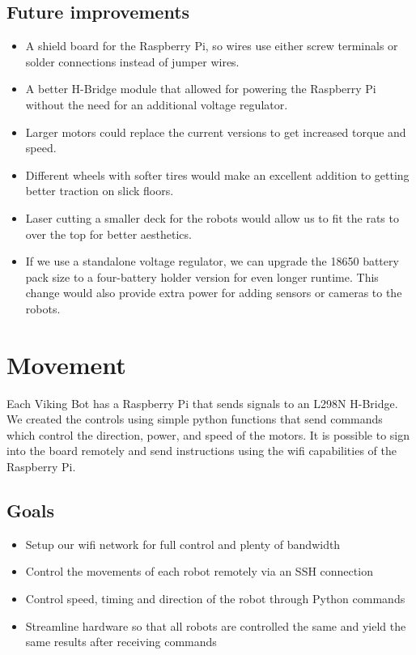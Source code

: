 \documentclass[a4paper,12pt]{article}
\begin{document}
\subsection{Future improvements}
	\begin{itemize}
		\item A shield board for the Raspberry Pi, so wires use either screw terminals or solder connections instead of jumper wires.
		\item A better H-Bridge module that allowed for powering the Raspberry Pi without the need for an additional voltage regulator.
		\item Larger motors could replace the current versions to get increased torque and speed.
		\item Different wheels with softer tires would make an excellent addition to getting better traction on slick floors.
		\item Laser cutting a smaller deck for the robots would allow us to fit the rats to over the top for better aesthetics.
		\item If we use a standalone voltage regulator, we can upgrade the 18650 battery pack size to a four-battery holder version for even longer runtime. This change would also provide extra power for adding sensors or cameras to the robots.
	\end{itemize}

\section{Movement}
	Each Viking Bot has a Raspberry Pi that sends signals to an L298N H-Bridge. We created the controls using simple python functions that send commands which control the direction, power, and speed of the motors. It is possible to sign into the board remotely and send instructions using the wifi capabilities of the Raspberry Pi.

\subsection{Goals}
	\begin{itemize}
		\item Setup our wifi network for full control and plenty of bandwidth
		\item Control the movements of each robot remotely via an SSH connection
		\item Control speed, timing and direction of the robot through Python commands
		\item Streamline hardware so that all robots are controlled the same and yield the same results after receiving commands

	\end{itemize}
\end{document}
